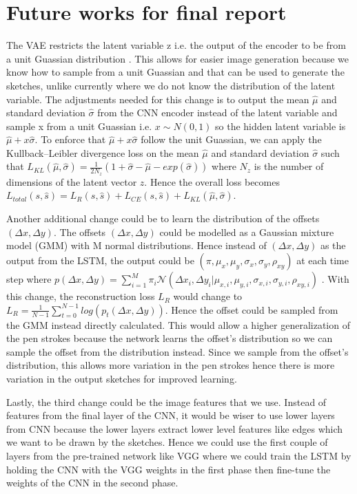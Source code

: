 \documentclass{article}
\begin{document}
\section{Future works for final report}
The VAE restricts the latent variable z i.e. the output of the encoder to be from a unit Guassian distribution \cite{journals/corr/KingmaW13}. This allows for easier image generation because we know how to sample from a unit Guassian and that can be used to generate the sketches, unlike currently where we do not know the distribution of the latent variable. The adjustments needed for this change is to output the mean $\hat{\mu}$ and standard deviation $\hat{\sigma}$ from the CNN encoder instead of the latent variable and sample x from a unit Guassian i.e. $x\sim N(0, 1)$ so the hidden latent variable is $\hat{\mu} + x \hat{\sigma}$. To enforce that $\hat{\mu} + x \hat{\sigma}$ follow the unit Guassian, we can apply the Kullback–Leibler divergence loss on the mean $\hat{\mu}$ and standard deviation $\hat{\sigma}$ such that $L_{KL}(\hat{\mu}, \hat{\sigma}) = \frac{1}{2 N_{z}} (1 + \hat{\sigma} - \hat{\mu} - exp(\hat{\sigma}))$\cite{qdpaper} where $N_{z}$ is the number of dimensions of the latent vector $z$. Hence the overall loss becomes $L_{total}(s, \hat{s}) = L_{R}(s, \hat{s}) + L_{CE}(s, \hat{s}) + L_{KL}(\hat{\mu}, \hat{\sigma})$.

Another additional change could be to learn the distribution of the offsets $(\Delta x, \Delta y)$. The offsets $(\Delta x, \Delta y)$ could be modelled as a Gaussian mixture model (GMM) with M normal distributions\cite{DBLP:journals/corr/Graves13}. Hence instead of $(\Delta x, \Delta y)$ as the output from the LSTM, the output could be $(\pi, \mu_{x}, \mu_{y}, \sigma_{x}, \sigma_{y}, \rho_{xy})$ at each time step where $p(\Delta x, \Delta y) = \sum_{i=1}^{M} \pi_{i} \mathcal{N}(\Delta x_{i}, \Delta y_{i} | \mu_{x, i}, \mu_{y, i}, \sigma_{x, i}, \sigma_{y, i}, \rho_{xy, i})$ \cite{DBLP:journals/corr/Graves13}. With this change, the reconstruction loss $L_{R}$ would change to $L_{R} = \frac{1}{N-1} \sum_{t=0}^{N-1} log(p_{t}(\Delta x, \Delta y))$. Hence the offset could be sampled from the GMM instead directly calculated. This would allow a higher generalization of the pen strokes because the network learns the offset's distribution so we can sample the offset from the distribution instead. Since we sample from the offset's distribution, this allows more variation in the pen strokes hence there is more variation in the output sketches for improved learning.

Lastly, the third change could be the image features that we use. Instead of features from the final layer of the CNN, it would be wiser to use lower layers from CNN because the lower layers extract lower level features like edges which we want to be drawn by the sketches. Hence we could use the first couple of layers from the pre-trained network like VGG \cite{DBLP:journals/corr/SimonyanZ14a} where we could train the LSTM by holding the CNN with the VGG weights in the first phase then fine-tune the weights of the CNN in the second phase.


{\small


}
\end{document}
